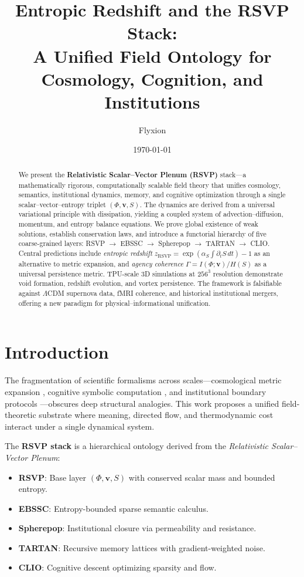 \documentclass[11pt,twoside]{article}
\title{\LARGE\textbf{Entropic Redshift and the RSVP Stack: \\ A Unified Field Ontology for Cosmology, Cognition, and Institutions}}
\author[1]{Flyxion}
\affil[1]{Independent Researcher}
\date{\today}
\theoremstyle{definition}
\theoremstyle{remark}
\begin{document}
\maketitle

\begin{abstract}
We present the \textbf{Relativistic Scalar--Vector Plenum (RSVP)} stack—a mathematically rigorous, computationally scalable field theory that unifies cosmology, semantics, institutional dynamics, memory, and cognitive optimization through a single scalar--vector--entropy triplet $(\Phi, \mathbf{v}, S)$. The dynamics are derived from a universal variational principle with dissipation, yielding a coupled system of advection--diffusion, momentum, and entropy balance equations. We prove global existence of weak solutions, establish conservation laws, and introduce a functorial hierarchy of five coarse-grained layers: RSVP $\to$ EBSSC $\to$ Spherepop $\to$ TARTAN $\to$ CLIO. Central predictions include \emph{entropic redshift} $z_{\mathrm{RSVP}} = \exp(\alpha_S \int \partial_t S\,dt) - 1$ as an alternative to metric expansion, and \emph{agency coherence} $\Gamma = I(\Phi;\mathbf{v})/H(S)$ as a universal persistence metric. TPU-scale 3D simulations at $256^3$ resolution demonstrate void formation, redshift evolution, and vortex persistence. The framework is falsifiable against $\Lambda$CDM supernova data, fMRI coherence, and historical institutional mergers, offering a new paradigm for physical--informational unification.
\end{abstract}

\section{Introduction}
\label{sec:intro}

The fragmentation of scientific formalisms across scales—cosmological metric expansion \cite{PlanckCollaboration2020}, cognitive symbolic computation \cite{Friston2021}, and institutional boundary protocols \cite{Deacon2012}—obscures deep structural analogies. This work proposes a unified field-theoretic substrate where meaning, directed flow, and thermodynamic cost interact under a single dynamical system.

The \textbf{RSVP stack} is a hierarchical ontology derived from the \emph{Relativistic Scalar--Vector Plenum}:
\begin{itemize}
\item \textbf{RSVP}: Base layer $(\Phi, \mathbf{v}, S)$ with conserved scalar mass and bounded entropy.
\item \textbf{EBSSC}: Entropy-bounded sparse semantic calculus.
\item \textbf{Spherepop}: Institutional closure via permeability and resistance.
\item \textbf{TARTAN}: Recursive memory lattices with gradient-weighted noise.
\item \textbf{CLIO}: Cognitive descent optimizing sparsity and flow.
\end{itemize}
\end{document}
